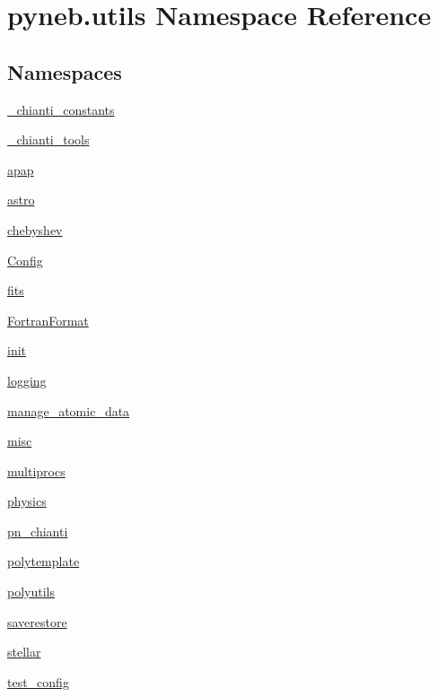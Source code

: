 \hypertarget{namespacepyneb_1_1utils}{}\section{pyneb.\+utils Namespace Reference}
\label{namespacepyneb_1_1utils}
\subsection*{Namespaces}
\begin{DoxyCompactItemize}
\item 
 \hyperlink{namespacepyneb_1_1utils_1_1__chianti__constants}{\+\_\+chianti\+\_\+constants}
\item 
 \hyperlink{namespacepyneb_1_1utils_1_1__chianti__tools}{\+\_\+chianti\+\_\+tools}
\item 
 \hyperlink{namespacepyneb_1_1utils_1_1apap}{apap}
\item 
 \hyperlink{namespacepyneb_1_1utils_1_1astro}{astro}
\item 
 \hyperlink{namespacepyneb_1_1utils_1_1chebyshev}{chebyshev}
\item 
 \hyperlink{namespacepyneb_1_1utils_1_1_config}{Config}
\item 
 \hyperlink{namespacepyneb_1_1utils_1_1fits}{fits}
\item 
 \hyperlink{namespacepyneb_1_1utils_1_1_fortran_format}{Fortran\+Format}
\item 
 \hyperlink{namespacepyneb_1_1utils_1_1init}{init}
\item 
 \hyperlink{namespacepyneb_1_1utils_1_1logging}{logging}
\item 
 \hyperlink{namespacepyneb_1_1utils_1_1manage__atomic__data}{manage\+\_\+atomic\+\_\+data}
\item 
 \hyperlink{namespacepyneb_1_1utils_1_1misc}{misc}
\item 
 \hyperlink{namespacepyneb_1_1utils_1_1multiprocs}{multiprocs}
\item 
 \hyperlink{namespacepyneb_1_1utils_1_1physics}{physics}
\item 
 \hyperlink{namespacepyneb_1_1utils_1_1pn__chianti}{pn\+\_\+chianti}
\item 
 \hyperlink{namespacepyneb_1_1utils_1_1polytemplate}{polytemplate}
\item 
 \hyperlink{namespacepyneb_1_1utils_1_1polyutils}{polyutils}
\item 
 \hyperlink{namespacepyneb_1_1utils_1_1saverestore}{saverestore}
\item 
 \hyperlink{namespacepyneb_1_1utils_1_1stellar}{stellar}
\item 
 \hyperlink{namespacepyneb_1_1utils_1_1test__config}{test\+\_\+config}
\end{DoxyCompactItemize}
